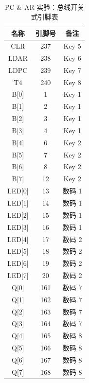 \begin{enumerate}
    \begin{table}[H]
        \centering
        \begin{tabular}{|c|c|c|}
            \hline
            名称 & 引脚号 & 备注 \\
            \hline
            CLR & 237 & Key 5 \\
            \hline
            LDAR & 238 & Key 6 \\
            \hline
            LDPC & 239 & Key 7 \\
            \hline
            T4 & 240 & Key 8 \\
            \hline
            B[0] & 1 & Key 1 \\
            \hline
            B[1] & 2 & Key 1 \\
            \hline
            B[2] & 3 & Key 1 \\
            \hline
            B[3] & 4 & Key 1 \\
            \hline
            B[4] & 6 & Key 2 \\
            \hline
            B[5] & 7 & Key 2 \\
            \hline
            B[6] & 8 & Key 2 \\
            \hline
            B[7] & 12 & Key 2 \\
            \hline
            LED[0] & 13 & 数码 1 \\
            \hline
            LED[1] & 14 & 数码 1 \\
            \hline
            LED[2] & 15 & 数码 1 \\
            \hline
            LED[3] & 16 & 数码 1 \\
            \hline
            LED[4] & 17 & 数码 2 \\
            \hline
            LED[5] & 18 & 数码 2 \\
            \hline
            LED[6] & 19 & 数码 2 \\
            \hline
            LED[7] & 20 & 数码 2 \\
            \hline
            Q[0] & 161 & 数码 7 \\
            \hline
            Q[1] & 162 & 数码 7 \\
            \hline
            Q[2] & 163 & 数码 7 \\
            \hline
            Q[3] & 164 & 数码 7 \\
            \hline
            Q[4] & 165 & 数码 8 \\
            \hline
            Q[5] & 166 & 数码 8 \\
            \hline
            Q[6] & 167 & 数码 8 \\
            \hline
            Q[7] & 168 & 数码 8 \\
            \hline
        \end{tabular}
        \caption{PC \& AR 实验：总线开关式引脚表}
        \label{tab:pin4_1}
    \end{table}
    

\end{enumerate}
